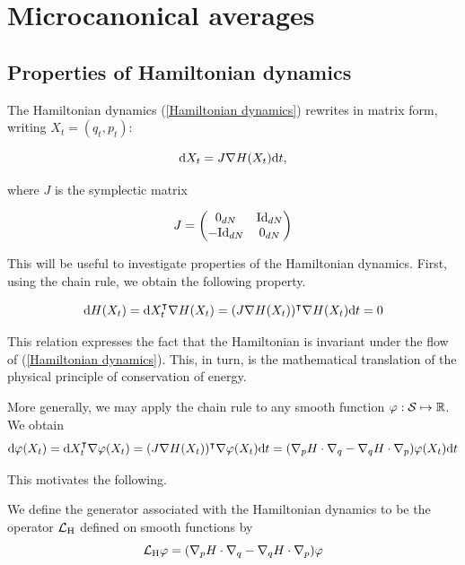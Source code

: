 


\section{Microcanonical averages}
\subsection{Properties of Hamiltonian dynamics}


The Hamiltonian dynamics (\ref{Hamiltonian dynamics}) rewrites in matrix form, writing $X_t=(q_t,p_t)$:

\begin{equation}\label{Hamiltonian dynamics matrix form} \text d X_t=J\nabla H(X_t)\text{d}t,\end{equation}

where $J$ is the symplectic matrix

$$J = \begin{pmatrix}
    0_{dN} & \mathrm{Id}_{dN}\\ -\mathrm{Id}_{dN} & 0_{dN}
\end{pmatrix}$$

This will be useful to investigate properties of the Hamiltonian dynamics. First, using the chain rule, we obtain the following property.

\begin{prop}
    \begin{equation}
    \label{conservation of energy} \text d H(X_t)=\text d X_t^{\intercal}\nabla H(X_t)=(J\nabla H(X_t))^\intercal \nabla H(X_t)\text{d}t=0
    \end{equation}
\end{prop}

    This relation expresses the fact that the Hamiltonian is invariant under the flow of (\ref{Hamiltonian dynamics}). This, in turn, is the mathematical translation of the physical principle of conservation of energy.
    
        More generally, we may apply the chain rule to any smooth function $\varphi: \mathcal{S} \mapsto \mathbb{R}$.
        We obtain 
        $$ \text d \varphi(X_t)= \text d X_t^{\intercal} \nabla \varphi(X_t)=(J \nabla H(X_t))^\intercal \nabla \varphi(X_t)\text{d}t=(\nabla_p H \cdot \nabla_q - \nabla_q H \cdot \nabla_p)\varphi(X_t)\text{d}t$$

        This motivates the following.
        \begin{definition}
            We define the generator associated with the Hamiltonian dynamics to be the operator $\mathcal{L}_{\text{H}}$ defined on smooth functions by
        \begin{equation}
            \label{Hamiltonian generator}
            \mathcal{L}_{\text{H}}\varphi=(\nabla_p H \cdot \nabla_q - \nabla_q H \cdot \nabla_p)\varphi
        \end{equation}
    \end{definition}

